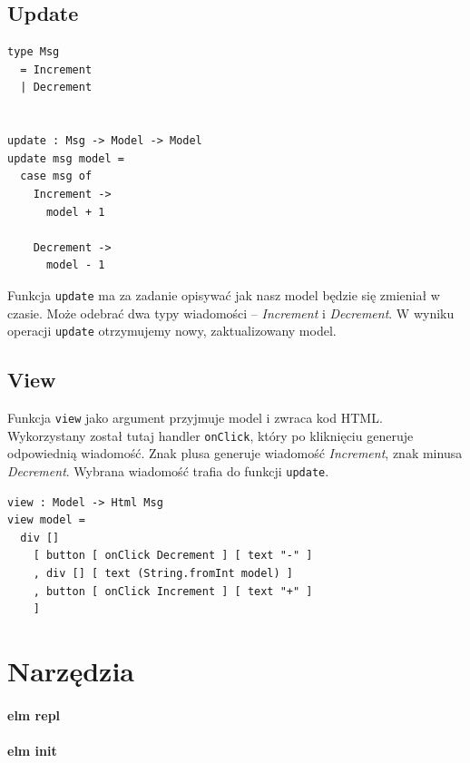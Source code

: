 \documentclass[twoside,a4paper]{report}
\begin{document}
\subsection{Update}
\begin{minipage}{.45\textwidth}
    \lstset{frame=single}
    \begin{lstlisting}[caption={\textit{The Elm Architecture} - Update},label=kod:Update]
type Msg
  = Increment
  | Decrement


update : Msg -> Model -> Model
update msg model =
  case msg of
    Increment ->
      model + 1

    Decrement ->
      model - 1
    \end{lstlisting}
\end{minipage}\hfill
\begin{minipage}{.50\textwidth}
    Funkcja \verb|update| ma za zadanie opisywać jak nasz model będzie się zmieniał w czasie.
    Może odebrać dwa typy wiadomości -- \textit{Increment} i \textit{Decrement}.
    W wyniku operacji \verb|update| otrzymujemy nowy, zaktualizowany model.
\end{minipage}\hfill
\subsection{View}
Funkcja \verb|view| jako argument przyjmuje model i zwraca kod HTML\@.
Wykorzystany został tutaj handler \verb|onClick|, który po kliknięciu generuje odpowiednią wiadomość.
Znak plusa generuje wiadomość \textit{Increment}, znak minusa \textit{Decrement}.
Wybrana wiadomość trafia do funkcji \verb|update|.

\lstset{frame=single}
\begin{lstlisting}[caption={\textit{The Elm Architecture} - View},label=kod:View]
view : Model -> Html Msg
view model =
  div []
    [ button [ onClick Decrement ] [ text "-" ]
    , div [] [ text (String.fromInt model) ]
    , button [ onClick Increment ] [ text "+" ]
    ]
\end{lstlisting}

\section{Narzędzia}

\paragraph{elm repl}

\paragraph{elm init}
\end{document}
